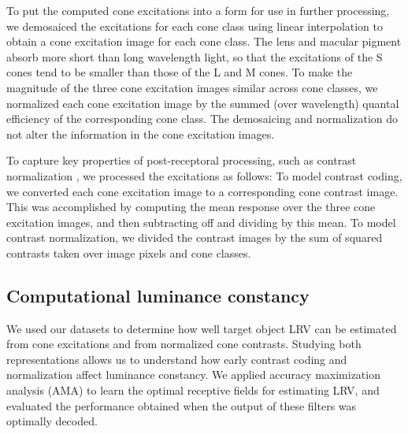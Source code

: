 \documentclass{jov}
\begin{document}
To put the computed cone excitations into a form for use in further processing, we demosaiced the excitations for each cone class using linear interpolation
to obtain a cone excitation image for each cone class.
The lens and macular pigment absorb more short than long wavelength light, so that the excitations of the S cones tend to be
smaller than those of the L and M cones.
To make the magnitude of the three cone excitation images similar across cone classes, we
normalized each cone excitation image by the summed (over wavelength) quantal efficiency of the corresponding cone class.
The demosaicing and normalization do not alter the information in the cone excitation images. 

To capture key properties of post-receptoral processing, such as contrast normalization \cite{heeger1992normalization,albrecht1991motion,carandini2012normalization}, 
we processed the excitations as follows:
To model contrast coding, we converted each cone excitation image to a corresponding cone contrast image.
This was accomplished by computing the mean response over the three cone excitation images, and then subtracting off and dividing by this mean.
To model contrast normalization, we divided the contrast images by the sum of squared contrasts taken over image pixels and cone classes.

\subsection{Computational luminance constancy} \label{method:SupervisedLearning}
We used our datasets to determine how well target object LRV can be estimated from cone excitations and from normalized cone contrasts.
Studying both representations allows us to understand how early contrast coding and normalization affect luminance constancy.
We applied accuracy maximization analysis (AMA) to learn the optimal receptive fields for estimating LRV,
and evaluated the performance obtained when the output of these filters was optimally decoded.
\end{document}
